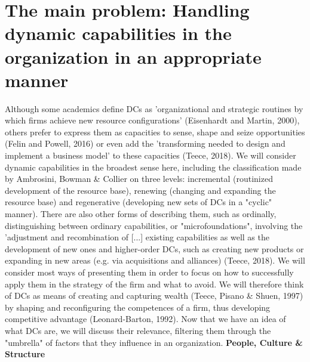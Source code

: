\documentclass[11pt]{article}
\begin{document}
\section{The main problem: Handling dynamic capabilities in the organization in an appropriate manner}
Although some academics define DCs as 'organizational and strategic routines by which firms achieve new resource configurations' (Eisenhardt and Martin, 2000), others prefer to express them as capacities to sense, shape and seize opportunities (Felin and Powell, 2016) or even add the 'transforming needed to design and implement a business model' to these capacities (Teece, 2018). We will consider dynamic capabilities in the broadest sense here, including the classification made by Ambrosini, Bowman \& Collier on three levels: incremental (routinized development of the resource base), renewing (changing and expanding the resource base) and regenerative (developing new sets of DCs in a "cyclic" manner). There are also other forms of describing them, such as ordinally, distinguishing between ordinary capabilities, or "microfoundations", involving the 'adjustment and recombination of [...] existing capabilities as well as the development of new ones and higher-order DCs, such as creating new products or expanding in new areas (e.g. via acquisitions and alliances) (Teece, 2018). We will consider most ways of presenting them in order to focus on how to successfully apply them in the strategy of the firm and what to avoid. We will therefore think of DCs as means of creating and capturing wealth (Teece, Pisano \& Shuen, 1997) by shaping and reconfiguring the competences of a firm, thus developing competitive advantage (Leonard-Barton, 1992). Now that we have an idea of what DCs are, we will discuss their relevance, filtering them through the "umbrella" of factors that they influence in an organization. \newline \newline
\textbf{People, Culture \& Structure} \newline \newline
\end{document}
